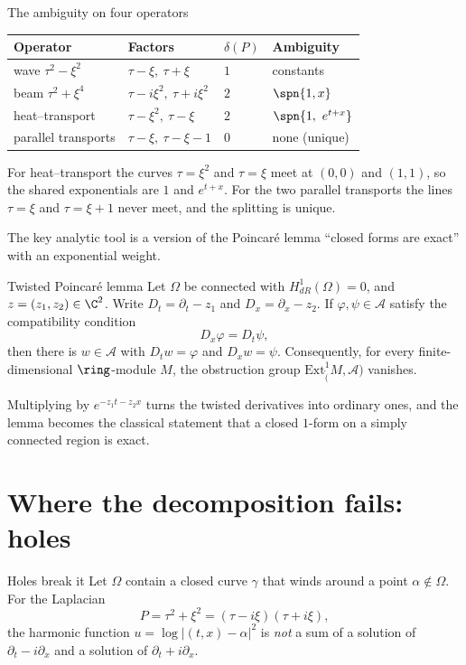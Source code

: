 \begin{example}{The ambiguity on four operators}
\begin{center}\small
\begin{tabular}{@{}L{3.0cm}L{4.4cm}L{1.0cm}L{4.4cm}@{}}
\toprule
Operator & Factors & $\delta(P)$ & Ambiguity\\\midrule
wave $\tau^2-\xi^2$ & $\tau-\xi,\ \tau+\xi$ & $1$ & constants\\
beam $\tau^2+\xi^4$ & $\tau-i\xi^2,\ \tau+i\xi^2$ & $2$ & $\spn\{1,x\}$\\
heat--transport & $\tau-\xi^2,\ \tau-\xi$ & $2$ & $\spn\{1,\ e^{t+x}\}$\\
parallel transports & $\tau-\xi,\ \tau-\xi-1$ & $0$ & none (unique)\\\bottomrule
\end{tabular}
\end{center}
For heat--transport the curves $\tau=\xi^2$ and $\tau=\xi$ meet at $(0,0)$ and $(1,1)$, so the shared exponentials are $1$ and $e^{t+x}$. For the two parallel transports the lines $\tau=\xi$ and $\tau=\xi+1$ never meet, and the splitting is unique.
\end{example}

The key analytic tool is a version of the Poincar\'e lemma ``closed forms are exact'' with an exponential weight.

\begin{lemma}{Twisted Poincar\'e lemma  \proved}\label{lem:twisted}
Let $\Omega$ be connected with $H^1_{dR}(\Omega)=0$, and $z=(z_1,z_2)\in\C^2$. Write $D_t=\partial_t-z_1$ and $D_x=\partial_x-z_2$. If $\varphi,\psi\in\mathcal A$ satisfy the compatibility condition
\[
D_x\varphi=D_t\psi,
\]
then there is $w\in\mathcal A$ with $D_tw=\varphi$ and $D_xw=\psi$. Consequently, for every finite-dimensional $\ring$-module $M$, the obstruction group $\mathrm{Ext}^1_\ring(M,\mathcal A)$ vanishes.

\end{lemma}

Multiplying by $e^{-z_1t-z_2x}$ turns the twisted derivatives into ordinary ones, and the lemma becomes the classical statement that a closed $1$-form on a simply connected region is exact.

\section{Where the decomposition fails: holes}

\begin{proposition}{Holes break it  \proved}\label{prop:holes}
Let $\Omega$ contain a closed curve $\gamma$ that winds around a point $\alpha\notin\Omega$. For the Laplacian
\[
P=\tau^2+\xi^2=(\tau-i\xi)(\tau+i\xi),
\]
the harmonic function $u=\log|(t,x)-\alpha|^2$ is \emph{not} a sum of a solution of $\partial_t-i\partial_x$ and a solution of $\partial_t+i\partial_x$.

\end{proposition}

